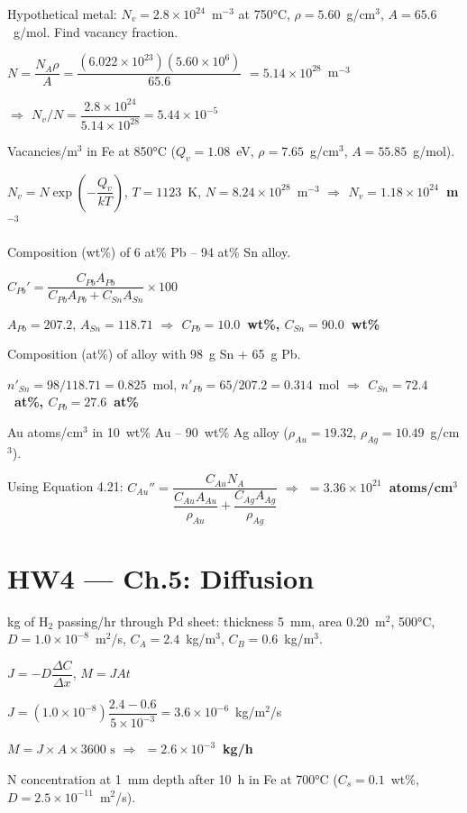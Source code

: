 \documentclass[8pt,letterpaper]{extarticle}
\newcommand{\prob}[1]{\smallskip\noindent{\footnotesize\bfseries\color{black!80} #1\quad}}
\newcommand{\soln}{\noindent{\footnotesize\itshape\color{blue!50!black}Sol: }}
\newcommand{\ans}[1]{{\footnotesize\bfseries\color{green!40!black}$\Rightarrow$ #1}}
\begin{document}
\begin{multicols*}{3}
\prob{4.2} Hypothetical metal: $N_v=2.8\times10^{24}$~m$^{-3}$ at 750°C, $\rho=5.60$~g/cm$^3$, $A=65.6$~g/mol. Find vacancy fraction.

\soln $N = \dfrac{N_A \rho}{A} = \dfrac{(6.022\times10^{23})(5.60\times10^6)}{65.6}$
$= 5.14\times10^{28}$~m$^{-3}$

\ans{$N_v/N = \dfrac{2.8\times10^{24}}{5.14\times10^{28}} = 5.44\times10^{-5}$}

\prob{4.4} Vacancies/m$^3$ in Fe at 850°C ($Q_v=1.08$~eV, $\rho=7.65$~g/cm$^3$, $A=55.85$~g/mol).

\soln $N_v = N\exp\left(-\dfrac{Q_v}{kT}\right)$, $T=1123$~K, $N=8.24\times10^{28}$~m$^{-3}$
\ans{$N_v = 1.18\times10^{24}$~m$^{-3}$}

\prob{4.14} Composition (wt\%) of 6 at\% Pb -- 94 at\% Sn alloy.

\soln $C_{Pb}' = \dfrac{C_{Pb}A_{Pb}}{C_{Pb}A_{Pb}+C_{Sn}A_{Sn}}\times100$

$A_{Pb}=207.2$, $A_{Sn}=118.71$ \ans{$C_{Pb}=10.0$~wt\%, $C_{Sn}=90.0$~wt\%}

\prob{4.16} Composition (at\%) of alloy with 98~g Sn + 65~g Pb.

\soln $n'_{Sn}=98/118.71=0.825$~mol, $n'_{Pb}=65/207.2=0.314$~mol
\ans{$C_{Sn}=72.4$~at\%, $C_{Pb}=27.6$~at\%}

\prob{4.26} Au atoms/cm$^3$ in 10~wt\% Au -- 90~wt\% Ag alloy ($\rho_{Au}=19.32$, $\rho_{Ag}=10.49$~g/cm$^3$).

\soln Using Equation 4.21:
$C_{Au}'' = \dfrac{C_{Au}N_A}{\dfrac{C_{Au}A_{Au}}{\rho_{Au}}+\dfrac{C_{Ag}A_{Ag}}{\rho_{Ag}}}$
\ans{$= 3.36\times10^{21}$~atoms/cm$^3$}

\section*{HW4 — Ch.5: Diffusion}

\prob{5.8} kg of H$_2$ passing/hr through Pd sheet: thickness 5~mm, area 0.20~m$^2$, 500°C, $D=1.0\times10^{-8}$~m$^2$/s, $C_A=2.4$~kg/m$^3$, $C_B=0.6$~kg/m$^3$.

\soln $J = -D\dfrac{\Delta C}{\Delta x}$, $M = JAt$

$J = (1.0\times10^{-8})\dfrac{2.4-0.6}{5\times10^{-3}} = 3.6\times10^{-6}$~kg/m$^2$/s

$M = J\times A\times 3600\text{ s}$ \ans{$= 2.6\times10^{-3}$~kg/h}

\prob{5.15} N concentration at 1~mm depth after 10~h in Fe at 700°C ($C_s=0.1$~wt\%, $D=2.5\times10^{-11}$~m$^2$/s).


\end{multicols*}
\end{document}
